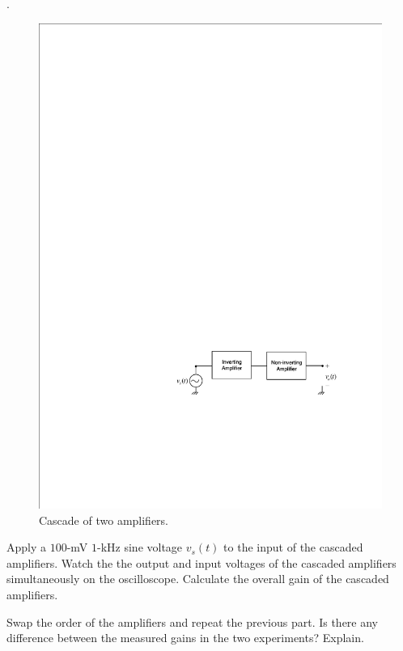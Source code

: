 \documentclass[11pt]{article}
\begin{document}
\begin{question}

    .

    \begin{figure}[H]
        \centering
        \includegraphics[scale=1.2,angle=0]{Fig/cir5.pdf}
        \caption{Cascade of two amplifiers.} \label{fig:cir5}
    \end{figure}

    \begin{subquestion}{Apply a $100$-mV $1$-kHz sine voltage $v_{s}(t)$ to the input of the cascaded amplifiers. Watch the the output and input voltages of the cascaded amplifiers simultaneously on the oscilloscope. Calculate the overall gain of the cascaded amplifiers.}
        \answer{}
    \end{subquestion}

    \begin{subquestion}{Swap the order of the amplifiers and repeat the previous part. Is there any difference between the measured gains in the two experiments? Explain.}
        \answer{}
    \end{subquestion}

\end{question}
\end{document}
